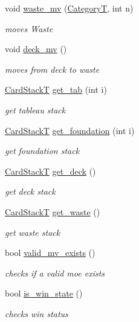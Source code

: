 \begin{DoxyCompactItemize}
void \hyperlink{class_board_t_a03271c9db60fdf2a7943f6e3b41542d3}{waste\+\_\+mv} (\hyperlink{_card_types_8h_aa77f81f8d4c8aa57046a50ca32d6b7b4}{CategoryT}, int n)
\begin{DoxyCompactList}\small\item\em moves Waste \end{DoxyCompactList}\item 
void \hyperlink{class_board_t_a548e3e518666a6f38b49e072a88a6d2c}{deck\+\_\+mv} ()
\begin{DoxyCompactList}\small\item\em moves from deck to waste \end{DoxyCompactList}\item 
\hyperlink{_card_stack_8h_a29a6854caf5fec306ee8fc0c6b453837}{Card\+StackT} \hyperlink{class_board_t_af7157e485cd48aa4c3f52d391af1fef3}{get\+\_\+tab} (int i)
\begin{DoxyCompactList}\small\item\em get tableau stack \end{DoxyCompactList}\item 
\hyperlink{_card_stack_8h_a29a6854caf5fec306ee8fc0c6b453837}{Card\+StackT} \hyperlink{class_board_t_ac61569f97fe32c08aeecc0583170282c}{get\+\_\+foundation} (int i)
\begin{DoxyCompactList}\small\item\em get foundation stack \end{DoxyCompactList}\item 
\hyperlink{_card_stack_8h_a29a6854caf5fec306ee8fc0c6b453837}{Card\+StackT} \hyperlink{class_board_t_a2f28e0a5e9c34f396e2aebc79342a225}{get\+\_\+deck} ()
\begin{DoxyCompactList}\small\item\em get deck stack \end{DoxyCompactList}\item 
\hyperlink{_card_stack_8h_a29a6854caf5fec306ee8fc0c6b453837}{Card\+StackT} \hyperlink{class_board_t_a1e3a7edd2e993d22a453da1487177585}{get\+\_\+waste} ()
\begin{DoxyCompactList}\small\item\em get waste stack \end{DoxyCompactList}\item 
bool \hyperlink{class_board_t_a9420e96ccd6692d0e63054277c5ef672}{valid\+\_\+mv\+\_\+exists} ()
\begin{DoxyCompactList}\small\item\em checks if a valid moe exists \end{DoxyCompactList}\item 
bool \hyperlink{class_board_t_a163bed593a3f0ba24dd5401b595b75cd}{is\+\_\+win\+\_\+state} ()
\begin{DoxyCompactList}\small\item\em checks win status \end{DoxyCompactList}\end{DoxyCompactItemize}


